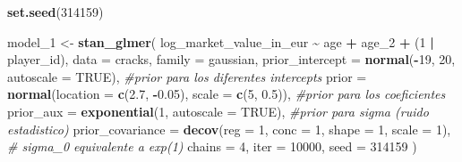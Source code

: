 \documentclass[
]{article}
\newenvironment{Shaded}{\begin{snugshade}}{\end{snugshade}}
\newcommand{\AttributeTok}[1]{\textcolor[rgb]{0.13,0.29,0.53}{#1}}
\newcommand{\CommentTok}[1]{\textcolor[rgb]{0.56,0.35,0.01}{\textit{#1}}}
\newcommand{\ConstantTok}[1]{\textcolor[rgb]{0.56,0.35,0.01}{#1}}
\newcommand{\DecValTok}[1]{\textcolor[rgb]{0.00,0.00,0.81}{#1}}
\newcommand{\FloatTok}[1]{\textcolor[rgb]{0.00,0.00,0.81}{#1}}
\newcommand{\FunctionTok}[1]{\textcolor[rgb]{0.13,0.29,0.53}{\textbf{#1}}}
\newcommand{\NormalTok}[1]{#1}
\newcommand{\OtherTok}[1]{\textcolor[rgb]{0.56,0.35,0.01}{#1}}
\newcommand{\SpecialCharTok}[1]{\textcolor[rgb]{0.81,0.36,0.00}{\textbf{#1}}}
\begin{document}
\begin{Shaded}
\begin{Highlighting}[]
\FunctionTok{set.seed}\NormalTok{(}\DecValTok{314159}\NormalTok{)}

\NormalTok{model\_1 }\OtherTok{\textless{}{-}} \FunctionTok{stan\_glmer}\NormalTok{(}
\NormalTok{  log\_market\_value\_in\_eur }\SpecialCharTok{\textasciitilde{}}\NormalTok{ age }\SpecialCharTok{+}\NormalTok{ age\_2 }\SpecialCharTok{+}\NormalTok{ (}\DecValTok{1} \SpecialCharTok{|}\NormalTok{ player\_id),}
  \AttributeTok{data =}\NormalTok{ cracks,}
  \AttributeTok{family =}\NormalTok{ gaussian,}
  \AttributeTok{prior\_intercept =} \FunctionTok{normal}\NormalTok{(}\SpecialCharTok{{-}}\DecValTok{19}\NormalTok{, }\DecValTok{20}\NormalTok{, }\AttributeTok{autoscale =} \ConstantTok{TRUE}\NormalTok{), }\CommentTok{\#prior para los diferentes intercepts}
  \AttributeTok{prior =} \FunctionTok{normal}\NormalTok{(}\AttributeTok{location =} \FunctionTok{c}\NormalTok{(}\FloatTok{2.7}\NormalTok{, }\SpecialCharTok{{-}}\FloatTok{0.05}\NormalTok{), }\AttributeTok{scale =} \FunctionTok{c}\NormalTok{(}\DecValTok{5}\NormalTok{, }\FloatTok{0.5}\NormalTok{)), }\CommentTok{\#prior para los coeficientes}
  \AttributeTok{prior\_aux =} \FunctionTok{exponential}\NormalTok{(}\DecValTok{1}\NormalTok{, }\AttributeTok{autoscale =} \ConstantTok{TRUE}\NormalTok{), }\CommentTok{\#prior para sigma (ruido estadistico)}
  \AttributeTok{prior\_covariance =} \FunctionTok{decov}\NormalTok{(}\AttributeTok{reg =} \DecValTok{1}\NormalTok{, }\AttributeTok{conc =} \DecValTok{1}\NormalTok{, }\AttributeTok{shape =} \DecValTok{1}\NormalTok{, }\AttributeTok{scale =} \DecValTok{1}\NormalTok{), }\CommentTok{\# sigma\_0 equivalente a exp(1)}
  \AttributeTok{chains =} \DecValTok{4}\NormalTok{, }
  \AttributeTok{iter =} \DecValTok{10000}\NormalTok{, }
  \AttributeTok{seed =} \DecValTok{314159}
\NormalTok{)}
\end{Highlighting}
\end{Shaded}
\end{document}
